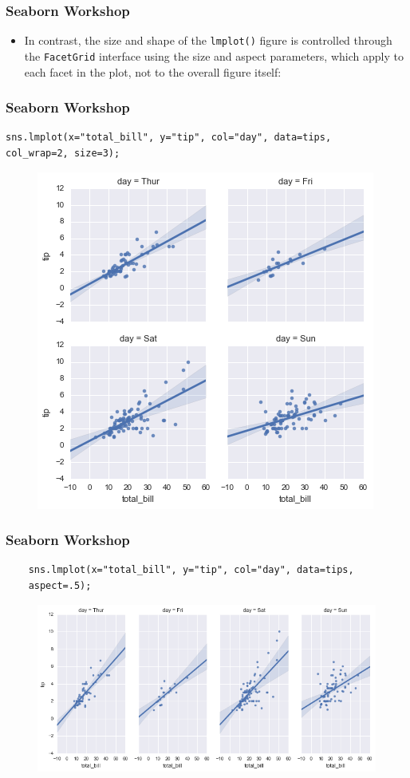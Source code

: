 \documentclass{beamer}
\begin{document}
\begin{frame}[fragile]
	\frametitle{Seaborn Workshop}
	\large
	\begin{itemize}
\item In contrast, the size and shape of the \texttt{lmplot()} figure is controlled through the \texttt{FacetGrid} interface using the size and aspect parameters, which apply to each facet in the plot, not to the overall figure itself:
	\end{itemize}

\end{frame}
\begin{frame}[fragile]
	\frametitle{Seaborn Workshop}
	\large
	\begin{verbatim}
sns.lmplot(x="total_bill", y="tip", col="day", data=tips,
col_wrap=2, size=3);
	\end{verbatim}

\begin{figure}
	\centering
	\includegraphics[width=0.55\linewidth]{images/regression_48_0}
\end{figure}
\end{frame}
\begin{frame}[fragile]
	\frametitle{Seaborn Workshop}
	\large
\begin{verbatim}
	sns.lmplot(x="total_bill", y="tip", col="day", data=tips,
	aspect=.5);
\end{verbatim}

\begin{figure}
	\centering
	\includegraphics[width=0.7\linewidth]{images/regression_49_0}
\end{figure}
\end{frame}
\end{document}

